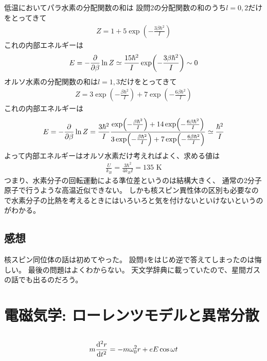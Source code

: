 \documentclass[../../master.tex]{subfiles}
\begin{document}
\subsection{}
低温においてパラ水素の分配関数の和は
設問2の分配関数の和のうち\(l=0,2\)だけをとってきて
\begin{align}
    Z = 1 +5\exp(-\frac{3\beta\hbar^2}{I})
\end{align}
これの内部エネルギーは
\begin{align}
    E = -\pdv{\beta}\ln Z \simeq \frac{15\hbar^2}{I}\exp(-\frac{3\beta\hbar^2}{I})\sim 0
\end{align}
オルソ水素の分配関数の和は\(l=1,3\)だけをとってきて
\begin{align}
    Z = 3\exp(-\frac{\beta\hbar^2}{I}) +7\exp(-\frac{6\beta\hbar^2}{I})
\end{align}
これの内部エネルギーは
\begin{align}
    E = -\pdv{\beta}\ln Z
    = \frac{3\hbar^2}{I}\dfrac{\exp(-\frac{\beta\hbar^2}{I}) +14\exp(-\frac{6\beta\hbar^2}{I})}{3\exp(-\frac{\beta\hbar^2}{I}) +7\exp(-\frac{6\beta\hbar^2}{I})}
    \simeq \frac{\hbar^2 }{I}
\end{align}
よって内部エネルギーはオルソ水素だけ考えればよく、求める値は
\begin{align}
    \frac{U}{k_B} = \frac{3\hbar^2}{4k_BI} = 135 \text{ K}
\end{align}
つまり、水素分子の回転運動による準位差というのは結構大きく、
通常の2分子原子で行うような高温近似できない。
しかも核スピン異性体の区別も必要なので水素分子の比熱を考えるときにはいろいろと気を付けないといけないというのがわかる。

\subsection*{感想}
核スピン同位体の話は初めてやった。
設問4をはじめ逆で答えてしまったのは悔しい。
最後の問題はよくわからない。
天文学辞典に載っていたので、星間ガスの話でも出るのだろう。

\clearpage
\section{電磁気学: ローレンツモデルと異常分散}
\subsection{}
\begin{align}
    m\dv[2]{r}{t} = -m\omega_0^2r +eE\cos\omega t
\end{align}
\end{document}
